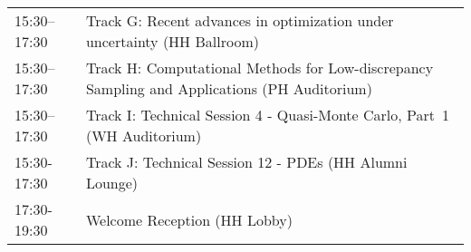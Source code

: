 \begin{table}
{\begin{tabularx}{\textwidth}{>{\hsize=0.32\hsize}X|>{\hsize=1.7\hsize}X}
\cellcolor{\SessionTitleColor}15:30–17:30 & \cellcolor{\SessionTitleColor}Track G: Recent advances in optimization under uncertainty (HH Ballroom) \\
\cellcolor{\SessionTitleColor}15:30–17:30 & \cellcolor{\SessionTitleColor}Track H: Computational Methods for Low-discrepancy Sampling and Applications (PH Auditorium) \\
\cellcolor{\SessionLightColor}15:30–17:30 & \cellcolor{\SessionLightColor}Track I: Technical Session 4 - Quasi-Monte Carlo, Part~1 (WH Auditorium) \\
\cellcolor{\SessionLightColor}15:30-17:30 & \cellcolor{\SessionLightColor}Track J: Technical Session 12 - PDEs (HH Alumni Lounge) \\
\cellcolor{\EmptyColor}17:30-19:30 & \cellcolor{\EmptyColor}Welcome Reception (HH Lobby) \\
\hline
\end{tabularx}
}
\end{table}

